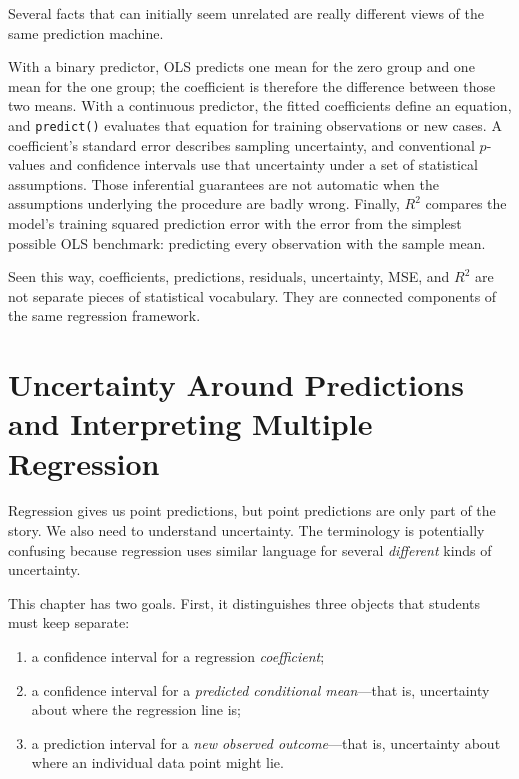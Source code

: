 \documentclass[11pt]{report}
\begin{document}
Several facts that can initially seem unrelated are really different views of the same prediction machine.

With a binary predictor, OLS predicts one mean for the zero group and one mean for the one group; the coefficient is therefore the difference between those two means. With a continuous predictor, the fitted coefficients define an equation, and \texttt{predict()} evaluates that equation for training observations or new cases. A coefficient's standard error describes sampling uncertainty, and conventional \(p\)-values and confidence intervals use that uncertainty under a set of statistical assumptions. Those inferential guarantees are not automatic when the assumptions underlying the procedure are badly wrong. Finally, \(R^2\) compares the model's training squared prediction error with the error from the simplest possible OLS benchmark: predicting every observation with the sample mean.

Seen this way, coefficients, predictions, residuals, uncertainty, MSE, and \(R^2\) are not separate pieces of statistical vocabulary. They are connected components of the same regression framework.


\chapter{Uncertainty Around Predictions and Interpreting Multiple Regression}
\label{chap:intervals_multiple}

Regression gives us point predictions, but point predictions are only part of the story. We also need to understand uncertainty. The terminology is potentially confusing because regression uses similar language for several \emph{different} kinds of uncertainty.

This chapter has two goals. First, it distinguishes three objects that students must keep separate:

\begin{enumerate}
    \item a confidence interval for a regression \emph{coefficient};
    \item a confidence interval for a \emph{predicted conditional mean}---that is, uncertainty about where the regression line is;
    \item a prediction interval for a \emph{new observed outcome}---that is, uncertainty about where an individual data point might lie.
\end{enumerate}
\end{document}
